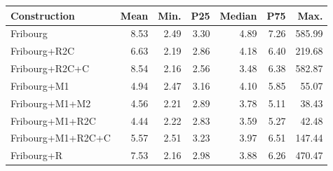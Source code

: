 \begin{tabular}{lrrrrrr}
  \hline
Construction & Mean & Min. & P25 & Median & P75 & Max. \\ 
  \hline
Fribourg & 8.53 & 2.49 & 3.30 & 4.89 & 7.26 & 585.99 \\ 
  Fribourg+R2C & 6.63 & 2.19 & 2.86 & 4.18 & 6.40 & 219.68 \\ 
  Fribourg+R2C+C & 8.54 & 2.16 & 2.56 & 3.48 & 6.38 & 582.87 \\ 
  Fribourg+M1 & 4.94 & 2.47 & 3.16 & 4.10 & 5.85 & 55.07 \\ 
  Fribourg+M1+M2 & 4.56 & 2.21 & 2.89 & 3.78 & 5.11 & 38.43 \\ 
  Fribourg+M1+R2C & 4.44 & 2.22 & 2.83 & 3.59 & 5.27 & 42.48 \\ 
  Fribourg+M1+R2C+C & 5.57 & 2.51 & 3.23 & 3.97 & 6.51 & 147.44 \\ 
  Fribourg+R & 7.53 & 2.16 & 2.98 & 3.88 & 6.26 & 470.47 \\ 
   \hline
\end{tabular}

